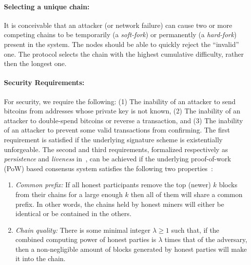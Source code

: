 \documentclass[]{report}   %
\begin{document}
\paragraph{Selecting a unique chain:} It is conceivable that an attacker (or network failure) can cause two or more competing chains to be temporarily (a {\em soft-fork}) or permanently (a {\em hard-fork}) present in the system. The nodes should be able to quickly reject the ``invalid'' one. The protocol selects the chain with the highest cumulative difficulty, rather then the longest one. 





\paragraph{Security Requirements:} For security, we require the following: (1) The inability of an attacker to send bitcoins from addresses whose private key is not known, (2) The inability of an attacker to double-spend bitcoins or reverse a transaction, and (3) The inability of an attacker to prevent some valid transactions from confirming. The first requirement is satisfied if the underlying signature scheme is existentially unforgeable. The second and third requirements, formalized respectively as {\em persistence} and {\em liveness} in~\cite{Garay2015}, can be achieved if the underlying proof-of-work (PoW) based consensus system satisfies the following two properties~\cite{Garay2015}:
\begin{enumerate}
	\item {\em Common prefix:} If all honest participants remove the top (newer) $k$ blocks from their chains for a large enough $k$ then all of them will share a common prefix. In other words, the chains held by honest miners will either be identical or be contained in the others.
	\item {\em Chain quality:} There is some minimal integer $\lambda\geq 1$ such that, if the combined computing power of honest parties is $\lambda$ times that of the adversary, then a non-negligible amount of blocks generated by honest parties will make it into the chain. 
\end{enumerate}
\end{document}
